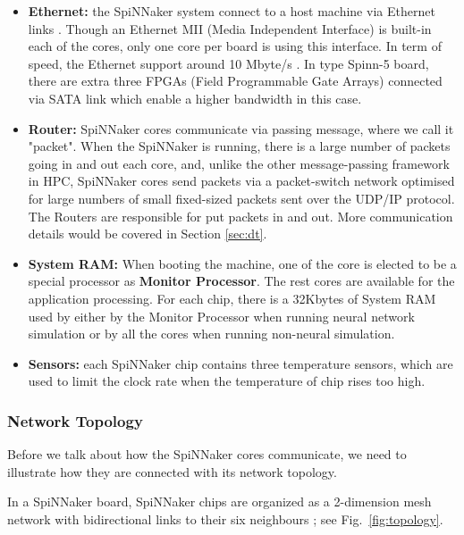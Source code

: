\begin{itemize}
    \item \textbf{Ethernet:} the SpiNNaker system connect to a host machine via Ethernet links \cite{furber2012overview}. Though an Ethernet MII (Media Independent Interface) is built-in each of the cores, only one core per board is using this interface. In term of speed, the Ethernet support around 10 Mbyte/s \cite{spin-chip-resources}. In type Spinn-5 board, there are extra three FPGAs (Field Programmable Gate Arrays) connected via SATA link which enable a higher bandwidth in this case. 
    
    \item \textbf{Router\label{sec:router}:} SpiNNaker cores communicate via passing message, where we call it "packet". When the SpiNNaker is running, there is a large number of packets going in and out each core, and, unlike the other message-passing framework in HPC, SpiNNaker cores send packets via a packet-switch network optimised for large numbers of small fixed-sized packets sent over the UDP/IP protocol. The Routers are responsible for put packets in and out. More communication details would be covered in Section \ref{sec:dt}.
    
    \item \textbf{System RAM:} When booting the machine, one of the core is elected to be a special processor as \textbf{Monitor Processor}. The rest cores are available for the application processing. For each chip, there is a 32Kbytes of System RAM used by either by the Monitor Processor when running neural network simulation or by all the cores when running non-neural simulation.
    
    \item \textbf{Sensors:} each SpiNNaker chip contains three temperature sensors, which are used to limit the clock rate when the temperature of chip rises too high.
\end{itemize}
\subsubsection{Network Topology}
Before we talk about how the SpiNNaker cores communicate, we need to illustrate how they are connected with its network topology.

In a SpiNNaker board, SpiNNaker chips are organized as a 2-dimension mesh network with bidirectional links to their six neighbours \cite{testchip}; see Fig.~\ref{fig:topology}. 

